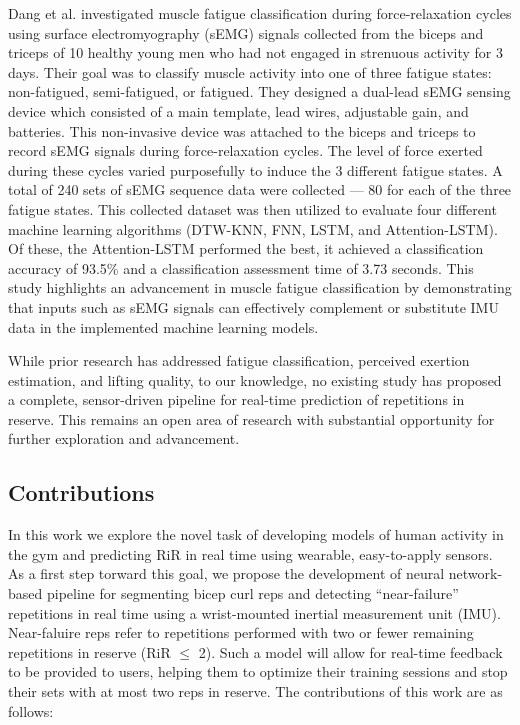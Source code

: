 \documentclass[conference]{IEEEtran}
\begin{document}
Dang et al. \cite{dang2023fatigue} investigated muscle fatigue classification during force-relaxation cycles using surface electromyography (sEMG) signals collected from the biceps and triceps of 10 healthy young men who had not engaged in strenuous activity for 3 days. Their goal was to classify muscle activity into one of three fatigue states: non-fatigued, semi-fatigued, or fatigued. They designed a dual-lead sEMG sensing device which consisted of a main template, lead wires, adjustable gain, and batteries. This non-invasive device was attached to the biceps and triceps to record sEMG signals during force-relaxation cycles. The level of force exerted during these cycles varied purposefully to induce the 3 different fatigue states. A total of 240 sets of sEMG sequence data were collected --- 80 for each of the three fatigue states. This collected dataset was then utilized to evaluate four different machine learning algorithms (DTW-KNN, FNN, LSTM, and Attention-LSTM). Of these, the Attention-LSTM performed the best, it achieved a classification accuracy of 93.5\% and a classification assessment time of 3.73 seconds. This study highlights an advancement in muscle fatigue classification by demonstrating that inputs such as sEMG signals can effectively complement or substitute IMU data in the implemented machine learning models.

While prior research has addressed fatigue classification, perceived exertion estimation, and lifting quality, to our knowledge, no existing study has proposed a complete, sensor-driven pipeline for real-time prediction of repetitions in reserve. This remains an open area of research with substantial opportunity for further exploration and advancement.

\subsection{Contributions}
In this work we explore the novel task of developing models of human activity in the gym and predicting RiR in real time using wearable, easy-to-apply sensors. As a first step torward this goal, we propose the development of neural network-based pipeline for segmenting bicep curl reps and detecting ``near-failure'' repetitions in real time using a wrist-mounted inertial measurement unit (IMU). Near-faluire reps refer to repetitions performed with two or fewer remaining repetitions in reserve (RiR $\leq$ 2). Such a model will allow for real-time feedback to be provided to users, helping them to optimize their training sessions and stop their sets with at most two reps in reserve. The contributions of this work are as follows:
\end{document}
